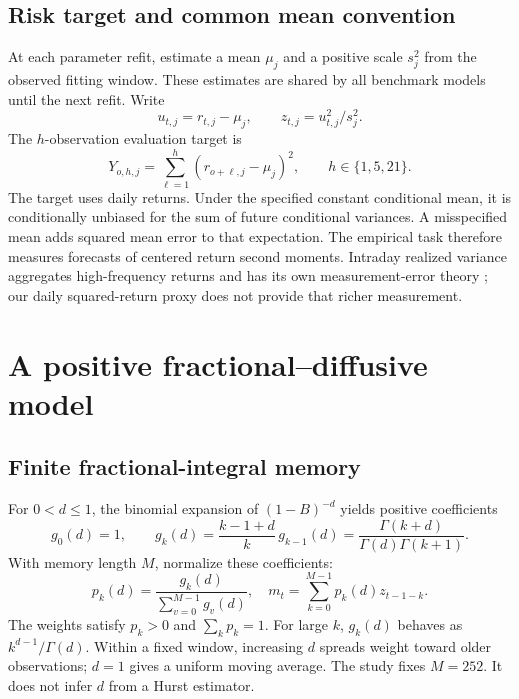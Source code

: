 \documentclass[12pt,a4paper]{article}
\begin{document}
\subsection{Risk target and common mean convention}
At each parameter refit, estimate a mean $\mu_j$ and a positive scale $s_j^2$
from the observed fitting window. These estimates are shared by all benchmark
models until the next refit. Write
\begin{equation}
u_{t,j}=r_{t,j}-\mu_j,\qquad z_{t,j}=u_{t,j}^2/s_j^2.
\end{equation}
The $h$-observation evaluation target is
\begin{equation}
Y_{o,h,j}=\sum_{\ell=1}^{h}(r_{o+\ell,j}-\mu_j)^2,
\qquad h\in\{1,5,21\}.
\label{eq:proxy}
\end{equation}
The target uses daily returns. Under the specified constant conditional mean,
it is conditionally unbiased for the sum of future conditional variances.
A misspecified mean adds squared mean error to that expectation. The empirical
task therefore measures forecasts of centered return second moments.
Intraday realized variance aggregates high-frequency returns and has its own
measurement-error theory \citep{barndorff2002}; our daily squared-return proxy
does not provide that richer measurement.

\section{A positive fractional--diffusive model}
\subsection{Finite fractional-integral memory}
For $0<d\le1$, the binomial expansion of $(1-B)^{-d}$ yields positive coefficients
\begin{equation}
g_0(d)=1,\qquad
g_k(d)=\frac{k-1+d}{k}\,g_{k-1}(d)
=\frac{\Gamma(k+d)}{\Gamma(d)\Gamma(k+1)}.
\label{eq:weights}
\end{equation}
With memory length $M$, normalize these coefficients:
\begin{equation}
p_k(d)=\frac{g_k(d)}{\sum_{v=0}^{M-1}g_v(d)},\quad
m_t=\sum_{k=0}^{M-1}p_k(d)z_{t-1-k}.
\label{eq:memory}
\end{equation}
The weights satisfy $p_k>0$ and $\sum_kp_k=1$. For large $k$, $g_k(d)$ behaves as
$k^{d-1}/\Gamma(d)$. Within a fixed window, increasing $d$ spreads weight toward
older observations; $d=1$ gives a uniform moving average. The study fixes
$M=252$. It does not infer $d$ from a Hurst estimator.
\end{document}

